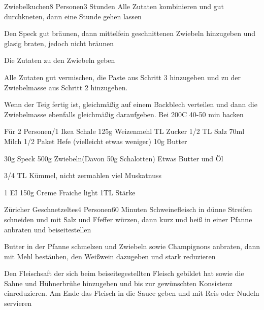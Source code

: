 
\begin{recipe}{Zwiebelkuchen}{8 Personen}{3 Stunden}
Alle Zutaten kombinieren und gut durchkneten, dann eine Stunde gehen lassen

Den Speck gut bräunen, dann mittelfein geschnittenen Zwiebeln hinzugeben und glasig braten, jedoch nicht bräunen

Die Zutaten zu den Zwiebeln geben

Alle Zutaten gut vermischen, die Paste aus Schritt 3 hinzugeben und zu der Zwiebelmasse aus Schritt 2 hinzugeben.

\ing[]{}{}
Wenn der Teig fertig ist, gleichmäßig auf einem Backblech verteilen und dann die Zwiebelmasse ebenfalls gleichmäßig daraufgeben. Bei 200\0C 40-50 min backen


Für 2 Personen/1 Ikea Schale
125g Weizenmehl
TL Zucker
1/2 TL Salz
70ml Milch
1/2 Paket Hefe (vielleicht etwas weniger)
10g Butter

30g Speck
500g Zwiebeln(Davon 50g Schalotten)
Etwas Butter und Öl

3/4 TL Kümmel, nicht zermahlen
viel Muskatnuss

1 EI
150g Creme Fraiche light
1TL Stärke
\end{recipe}


\begin{recipe}{Züricher Geschnetzeltes}{4 Personen}{60 Minuten}
Schweinefleisch in dünne Streifen schneiden und mit Salz und Ffeffer würzen, dann kurz und heiß in einer Pfanne anbraten und beiseitestellen

Butter in der Pfanne schmelzen und Zwiebeln sowie Champignons anbraten, dann mit Mehl bestäuben, den Weißwein dazugeben und stark reduzieren

Den Fleischsaft der sich beim beiseitegestellten Fleisch gebildet hat sowie die Sahne und Hühnerbrühe hinzugeben und bis zur gewünschten Konsistenz einreduzieren. Am Ende das Fleisch in die Sauce geben und mit Reis oder Nudeln servieren
\end{recipe}

